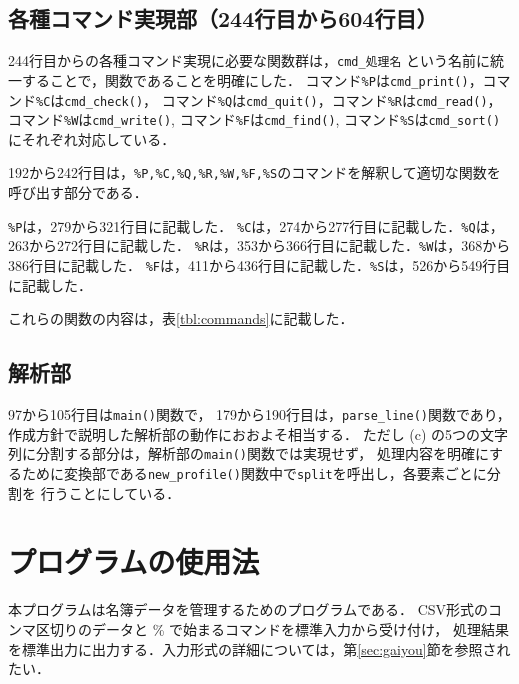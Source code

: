 \documentclass[a4j,11pt]{jarticle}
\begin{document}
\subsection{各種コマンド実現部（244行目から604行目）}
244行目からの各種コマンド実現に必要な関数群は，\verb|cmd_処理名| という名前に統一することで，関数であることを明確にした．
コマンド\verb|%P|は\verb|cmd_print()|，コマンド\verb|%C|は\verb|cmd_check()|，
コマンド\verb|%Q|は\verb|cmd_quit()|，コマンド\verb|%R|は\verb|cmd_read()|，
コマンド\verb|%W|は\verb|cmd_write()|, コマンド\verb|%F|は\verb|cmd_find()|, 
コマンド\verb|%S|は\verb|cmd_sort()|にそれぞれ対応している．

192から242行目は，\verb|%P,%C,%Q,%R,%W,%F,%S|のコマンドを解釈して適切な関数を呼び出す部分である．

\verb|%P|は，279から321行目に記載した．
\verb|%C|は，274から277行目に記載した．\verb|%Q|は，263から272行目に記載した．
\verb|%R|は，353から366行目に記載した．\verb|%W|は，368から386行目に記載した．
\verb|%F|は，411から436行目に記載した．\verb|%S|は，526から549行目に記載した．

これらの関数の内容は，表\ref{tbl:commands}に記載した．

\subsection{解析部}
97から105行目は\verb|main()|関数で，
179から190行目は，\verb|parse_line()|関数であり，作成方針で説明した解析部の動作におおよそ相当する．
ただし (c) の5つの文字列に分割する部分は，解析部の\verb|main()|関数では実現せず，
処理内容を明確にするために変換部である\verb|new_profile()|関数中で\verb|split|を呼出し，各要素ごとに分割を
行うことにしている．

\section{プログラムの使用法}\label{sec:use}

本プログラムは名簿データを管理するためのプログラムである．
CSV形式のコンマ区切りのデータと \% で始まるコマンドを標準入力から受け付け，
処理結果を標準出力に出力する．入力形式の詳細については，第\ref{sec:gaiyou}節を参照されたい．
\end{document}
